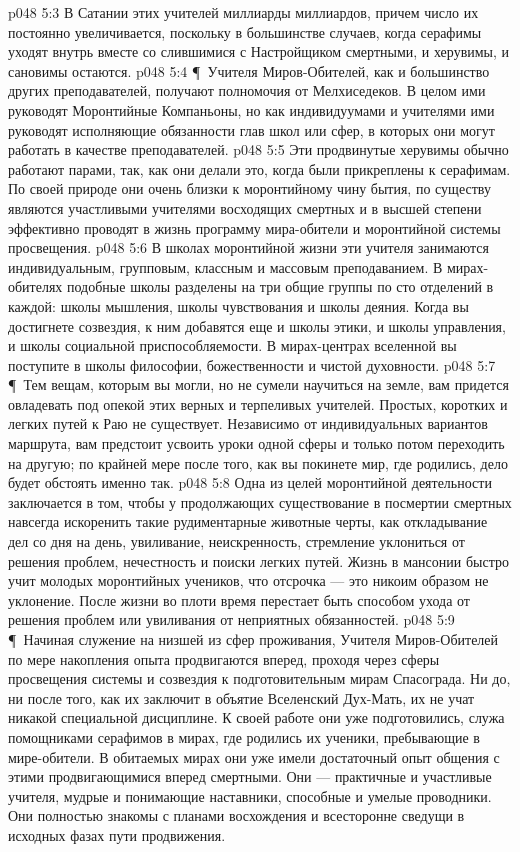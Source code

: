 \vs p048 5:3 В Сатании этих учителей миллиарды миллиардов, причем число их постоянно увеличивается, поскольку в большинстве случаев, когда серафимы уходят внутрь вместе со слившимися с Настройщиком смертными, и херувимы, и сановимы остаются.
\vs p048 5:4 \P\ Учителя Миров\hyp{}Обителей, как и большинство других преподавателей, получают полномочия от Мелхиседеков. В целом ими руководят Моронтийные Компаньоны, но как индивидуумами и учителями ими руководят исполняющие обязанности глав школ или сфер, в которых они могут работать в качестве преподавателей.
\vs p048 5:5 Эти продвинутые херувимы обычно работают парами, так, как они делали это, когда были прикреплены к серафимам. По своей природе они очень близки к моронтийному чину бытия, по существу являются участливыми учителями восходящих смертных и в высшей степени эффективно проводят в жизнь программу мира\hyp{}обители и моронтийной системы просвещения.
\vs p048 5:6 В школах моронтийной жизни эти учителя занимаются индивидуальным, групповым, классным и массовым преподаванием. В мирах\hyp{}обителях подобные школы разделены на три общие группы по сто отделений в каждой: школы мышления, школы чувствования и школы деяния. Когда вы достигнете созвездия, к ним добавятся еще и школы этики, и школы управления, и школы социальной приспособляемости. В мирах\hyp{}центрах вселенной вы поступите в школы философии, божественности и чистой духовности.
\vs p048 5:7 \P\ Тем вещам, которым вы могли, но не сумели научиться на земле, вам придется овладевать под опекой этих верных и терпеливых учителей. Простых, коротких и легких путей к Раю не существует. Независимо от индивидуальных вариантов маршрута, вам предстоит усвоить уроки одной сферы и только потом переходить на другую; по крайней мере после того, как вы покинете мир, где родились, дело будет обстоять именно так.
\vs p048 5:8 Одна из целей моронтийной деятельности заключается в том, чтобы у продолжающих существование в посмертии смертных навсегда искоренить такие рудиментарные животные черты, как откладывание дел со дня на день, увиливание, неискренность, стремление уклониться от решения проблем, нечестность и поиски легких путей. Жизнь в мансонии быстро учит молодых моронтийных учеников, что отсрочка --- это никоим образом не уклонение. После жизни во плоти время перестает быть способом ухода от решения проблем или увиливания от неприятных обязанностей.
\vs p048 5:9 \P\ Начиная служение на низшей из сфер проживания, Учителя Миров\hyp{}Обителей по мере накопления опыта продвигаются вперед, проходя через сферы просвещения системы и созвездия к подготовительным мирам Спасограда. Ни до, ни после того, как их заключит в объятие Вселенский Дух\hyp{}Мать, их не учат никакой специальной дисциплине. К своей работе они уже подготовились, служа помощниками серафимов в мирах, где родились их ученики, пребывающие в мире\hyp{}обители. В обитаемых мирах они уже имели достаточный опыт общения с этими продвигающимися вперед смертными. Они --- практичные и участливые учителя, мудрые и понимающие наставники, способные и умелые проводники. Они полностью знакомы с планами восхождения и всесторонне сведущи в исходных фазах пути продвижения.
